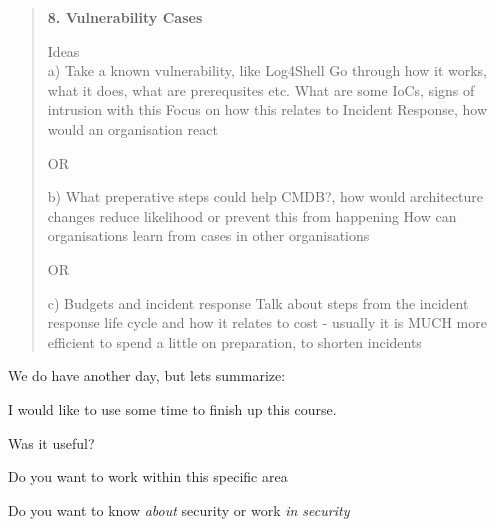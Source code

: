 \documentclass[Screen16to9,17pt]{foils}
\begin{document}
\begin{quote}
{\bf 8. Vulnerability Cases}

Ideas\\
a) Take a known vulnerability, like Log4Shell
Go through how it works, what it does, what are prerequsites etc.
What are some IoCs, signs of intrusion with this
Focus on how this relates to Incident Response, how would an organisation react

OR

b) What preperative steps could help CMDB?, how would architecture changes reduce likelihood or prevent this from happening
How can organisations learn from cases in other organisations

OR

c) Budgets and incident response
Talk about steps from the incident response life cycle and how it relates to cost
- usually it is MUCH more efficient to spend a little on preparation, to shorten incidents
\end{quote}



We do have another day, but lets summarize:


I would like to use some time to finish up this course.

\begin{list2}
\item Was it useful?
\item Do you want to work within this specific area
\item Do you want to know \emph{about} security or work \emph{in security}
\end{list2}
\end{document}
